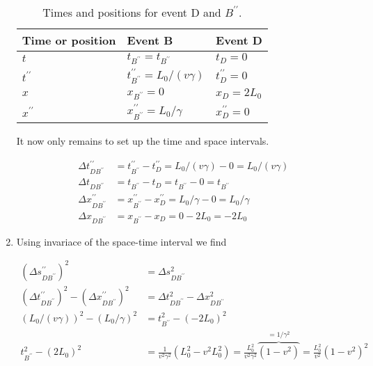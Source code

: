 \documentclass[a4paper,10pt,english]{article}
\begin{document}
\begin{enumerate}
\begin{table}[H]
  \begin{center}
    \begin{tabular}{| l | l | l |}
   	\hline
	 Time or position & Event B & Event D\\ \hline
	 $t$ & $t_{B^{\prime\prime}}=t_{B^{\prime\prime}}$ & $t_{D}=0$ \\ \hline
	 $t^{\prime\prime}$ & $t^{\prime\prime}_{B^{\prime\prime}}=L_{0}/(v\gamma)$ & $t_{D}^{\prime\prime}=0$\\ \hline
	 $x$ & $x_{B^{\prime\prime}}=0$ & $x_{D}=2L_{0}$\\ \hline
	 $x^{\prime\prime}$ & $x^{\prime\prime}_{B^{\prime\prime}}=L_{0}/\gamma$ & $x_{D}^{\prime\prime}=0$\\ \hline
	\end{tabular}
    \caption{Times and positions for event D and $B^{\prime\prime}$.}
    \label{tabel:ex_2A_8_2}
  \end{center}
\end{table}
\FloatBarrier

It now only remains to set up the time and space intervals.

\begin{align*}
\Delta t^{\prime\prime}_{DB^{\prime\prime}}&=t^{\prime\prime}_{B^{\prime\prime}}-t^{\prime\prime}_{D}=L_{0}/(v\gamma)-0=L_{0}/(v\gamma)\\
\Delta t_{DB^{\prime\prime}}&=t_{B^{\prime\prime}}-t_{D}=t_{B^{\prime\prime}}-0=t_{B^{\prime\prime}}\\
\Delta x^{\prime\prime}_{DB^{\prime\prime}}&=x^{\prime\prime}_{B^{\prime\prime}}-x^{\prime\prime}_{D}=L_{0}/\gamma-0=L_{0}/\gamma\\
\Delta x_{DB^{\prime\prime}}&=x_{B^{\prime\prime}}-x_{D}=0-2L_{0}=-2L_{0}
\end{align*}

\item Using invariace of the space-time interval we find

\begin{align*}
(\Delta s^{\prime\prime}_{DB^{\prime\prime}})^{2}&=\Delta s_{DB^{\prime\prime}}^{2}\\
(\Delta t^{\prime\prime}_{DB^{\prime\prime}})^{2}-(\Delta x^{\prime\prime}_{DB^{\prime\prime}})^{2}&=\Delta t_{DB^{\prime\prime}}^{2}-\Delta x_{DB^{\prime\prime}}^{2}\\
(L_{0}/(v\gamma))^{2}-(L_{0}/\gamma)^{2}&=t_{B^{\prime\prime}}^{2}-(-2L_{0})^{2}\\
t_{B^{\prime\prime}}^{2}-(2L_{0})^{2}&=\frac{1}{v^{2}\gamma^{2}}\left(L_{0}^{2}-v^{2}L_{0}^{2}\right)=\frac{L_{0}^{2}}{v^{2}\gamma^{2}}\overbrace{(1-v^{2})}^{=1/\gamma^{2}}=\frac{L_{0}^{2}}{v^{2}}(1-v^{2})^{2}
\end{align*}


\end{enumerate}
\end{document}
